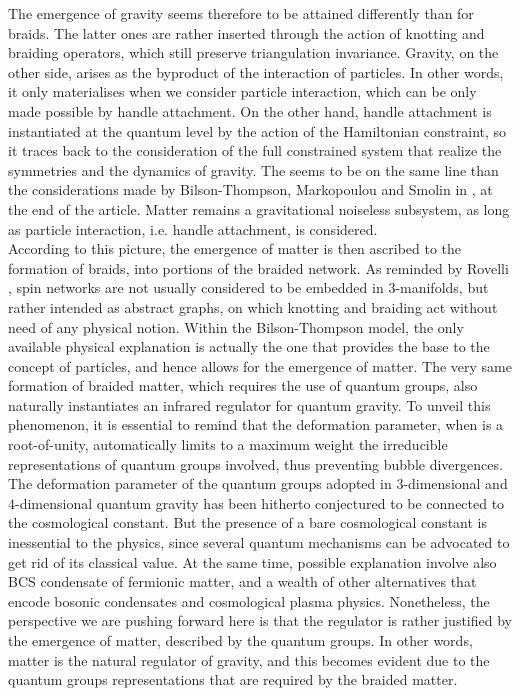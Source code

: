 \documentclass[aps,nofootinbib,amsfonts,superscriptaddress]{revtex4}
\begin{document}
The emergence of gravity seems therefore to be attained differently than for braids. The latter ones are rather inserted through the action of knotting and braiding  operators, which still preserve triangulation invariance. Gravity, on the other side, arises as the byproduct of the interaction of particles. In other words, it only materialises when we consider particle interaction, which can be only made possible by handle attachment. On the other hand, handle attachment is instantiated at the quantum level by the action of the Hamiltonian constraint, so it traces back to the consideration of the full constrained system that realize the symmetries and the dynamics of gravity. The seems to be on the same line than the considerations made by Bilson-Thompson, Markopoulou and Smolin in \cite{BT2}, at the end of the article. Matter remains a gravitational noiseless subsystem, as long as particle interaction, i.e. handle attachment, is considered. \\ 

According to this picture, the emergence of matter is then ascribed to the formation of braids, into portions of the braided network. As reminded by Rovelli \cite{Rovelli:2010wq}, spin networks are not usually considered to be embedded in $3$-manifolds, but rather intended as abstract graphs, on which knotting and braiding act without need of any physical notion. Within the Bilson-Thompson model, the only available physical explanation is actually the one that provides the base to the concept of particles, and hence allows for the emergence of matter. The very same formation of braided matter, which requires the use of quantum groups, also naturally instantiates an infrared regulator for quantum gravity. To unveil this phenomenon, it is essential to remind that the deformation parameter, when is a root-of-unity, automatically limits to a maximum weight the irreducible representations of quantum groups involved, thus preventing bubble divergences. \\ 

The deformation parameter of the quantum groups adopted in $3$-dimensional and $4$-dimensional quantum gravity has been hitherto conjectured to be connected to the cosmological constant. But the presence of a bare cosmological constant is inessential to the physics, since several quantum mechanisms can be advocated to get rid of its classical value. 
At the same time, possible explanation involve also BCS condensate of fermionic matter, and a wealth of other alternatives that encode bosonic condensates and cosmological plasma physics. Nonetheless, the perspective we are pushing forward here is that the regulator is rather justified by the emergence of matter, described by the quantum groups. In other words, matter is the natural regulator of gravity, and this becomes evident due to the quantum groups representations that are required by the braided matter. \\ 
\end{document}
